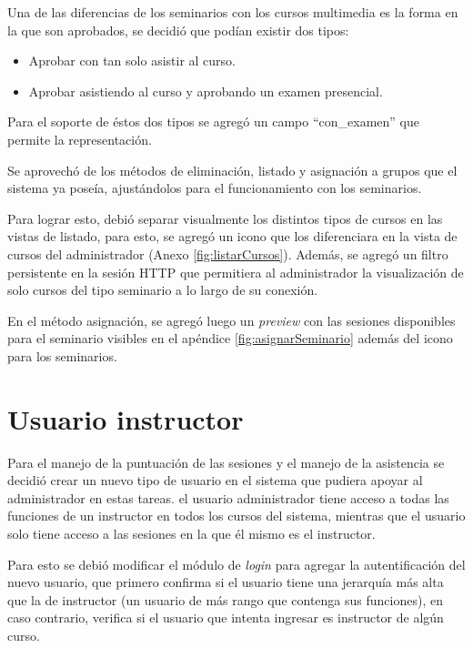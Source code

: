 	Una de las diferencias de los seminarios con los cursos multimedia es la forma en la que son aprobados, se decidió que podían existir dos tipos:

	\begin{itemize}
		\item Aprobar con tan solo asistir al curso.
		\item Aprobar asistiendo al curso y aprobando un examen presencial.
	\end{itemize}

	Para el soporte de éstos dos tipos se agregó un campo ``con\_examen'' que permite la representación.

	Se aprovechó de los métodos de eliminación, listado y asignación a grupos que el sistema ya poseía, ajustándolos para el funcionamiento con los seminarios. 

	Para lograr esto, debió separar visualmente los distintos tipos de cursos en las vistas de listado, para esto, se agregó un icono que los diferenciara en la vista de cursos del administrador (Anexo \ref{fig:listarCursos}). Además, se agregó un filtro persistente en la sesión \gls{HTTP} que permitiera al administrador la visualización de solo cursos del tipo seminario a lo largo de su conexión.

	En el método asignación, se agregó luego un \emph{preview} con las sesiones disponibles para el seminario visibles en el apéndice \ref{fig:asignarSeminario} además del icono para los seminarios. 


	\section{Usuario instructor} %
	\label{sec:usuario_instructor}
	
	Para el manejo de la puntuación de las sesiones y el manejo de la asistencia se decidió crear un nuevo tipo de usuario en el sistema que pudiera apoyar al administrador en estas tareas. el usuario administrador tiene acceso a todas las funciones de un instructor en todos los cursos del sistema, mientras que el usuario solo tiene acceso a las sesiones en la que él mismo es el instructor.

	Para esto se debió modificar el módulo de \emph{login} para agregar la autentificación del nuevo usuario, que primero confirma si el usuario tiene una jerarquía más alta que la de instructor (un usuario de más rango que contenga sus funciones), en caso contrario, verifica si el usuario que intenta ingresar es instructor de algún curso.

